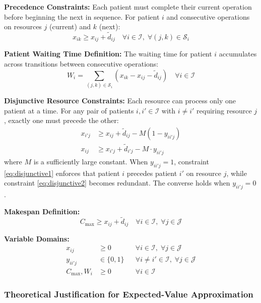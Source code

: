 \textbf{Precedence Constraints:} Each patient must complete their current operation before beginning the next in sequence. For patient $i$ and consecutive operations on resources $j$ (current) and $k$ (next):
\begin{equation}
x_{ik} \geq x_{ij} + \tilde{d}_{ij} \quad \forall i \in \mathcal{I}, \; \forall (j, k) \in \mathcal{S}_i
\label{eq:precedence}
\end{equation}

\textbf{Patient Waiting Time Definition:} The waiting time for patient $i$ accumulates across transitions between consecutive operations:
\begin{equation}
W_i = \sum_{(j,k) \in \mathcal{S}_i} \left( x_{ik} - x_{ij} - \tilde{d}_{ij} \right) \quad \forall i \in \mathcal{I}
\label{eq:wait_time}
\end{equation}

\textbf{Disjunctive Resource Constraints:} Each resource can process only one patient at a time. For any pair of patients $i, i' \in \mathcal{I}$ with $i \neq i'$ requiring resource $j$, exactly one must precede the other:
\begin{align}
x_{i'j} &\geq x_{ij} + \tilde{d}_{ij} - M(1 - y_{ii'j}) \label{eq:disjunctive1} \\
x_{ij} &\geq x_{i'j} + \tilde{d}_{i'j} - M \cdot y_{ii'j} \label{eq:disjunctive2}
\end{align}
where $M$ is a sufficiently large constant. When $y_{ii'j} = 1$, constraint \eqref{eq:disjunctive1} enforces that patient $i$ precedes patient $i'$ on resource $j$, while constraint \eqref{eq:disjunctive2} becomes redundant. The converse holds when $y_{ii'j} = 0$.

\textbf{Makespan Definition:}
\begin{equation}
C_{\max} \geq x_{ij} + \tilde{d}_{ij} \quad \forall i \in \mathcal{I}, \; \forall j \in \mathcal{J}
\label{eq:makespan}
\end{equation}

\textbf{Variable Domains:}
\begin{align}
x_{ij} &\geq 0 && \forall i \in \mathcal{I}, \; \forall j \in \mathcal{J} \\
y_{ii'j} &\in \{0, 1\} && \forall i \neq i' \in \mathcal{I}, \; \forall j \in \mathcal{J} \\
C_{\max}, W_i &\geq 0 && \forall i \in \mathcal{I}
\end{align}

\subsubsection{Theoretical Justification for Expected-Value Approximation}

